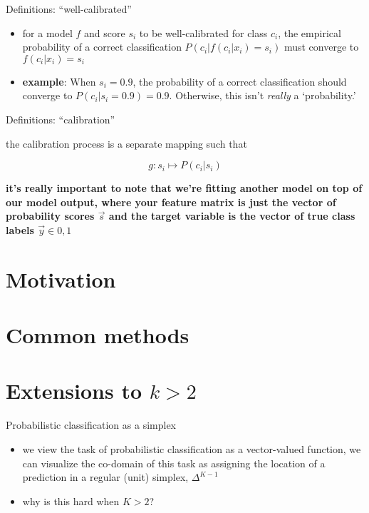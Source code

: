 \documentclass[ignorenonframetext,]{beamer}
\providecommand{\tightlist}{%
\setlength{\itemsep}{0pt}\setlength{\parskip}{0pt}}
\begin{document}
\begin{frame}{Definitions: ``well-calibrated''}

\begin{itemize}
\tightlist
\item
  for a model \(f\) and score \(s_i\) to be well-calibrated for class
  \(c_i\), the empirical probability of a correct classification
  \(P(c_i | f( c_i | x_i)=s_i)\) must converge to \(f(c_i | x_i) = s_i\)
  \vspace{5mm}
\item
  \textbf{example}: When \(s_i = 0.9\), the probability of a correct
  classification should converge to \(P(c_i | s_i = 0.9) = 0.9\).
  Otherwise, this isn't \textit{really} a `probability.'
\end{itemize}

\end{frame}

\begin{frame}{Definitions: ``calibration''}

the calibration process is a separate mapping such that

\[g: s_i \mapsto P(c_i | s_i)\]

\textbf{it's really important to note that we're fitting another model
on top of our model output, where your feature matrix is just the vector
of probability scores \(\vec{s}\) and the target variable is the vector
of true class labels \(\vec{y} \in {0,1}\)}

\end{frame}

\section{Motivation}\label{motivation}

\section{Common methods}\label{common-methods}

\section{\texorpdfstring{Extensions to
\(k > 2\)}{Extensions to k \textgreater{} 2}}\label{extensions-to-k-2}

\begin{frame}{Probabilistic classification as a simplex}

\begin{itemize}
\item
  we view the task of probabilistic classification as a vector-valued
  function, we can visualize the co-domain of this task as assigning the
  location of a prediction in a regular (unit) simplex, \(\Delta^{K-1}\)
\item
  why is this hard when \(K > 2\)?
\end{itemize}

\end{frame}
\end{document}
